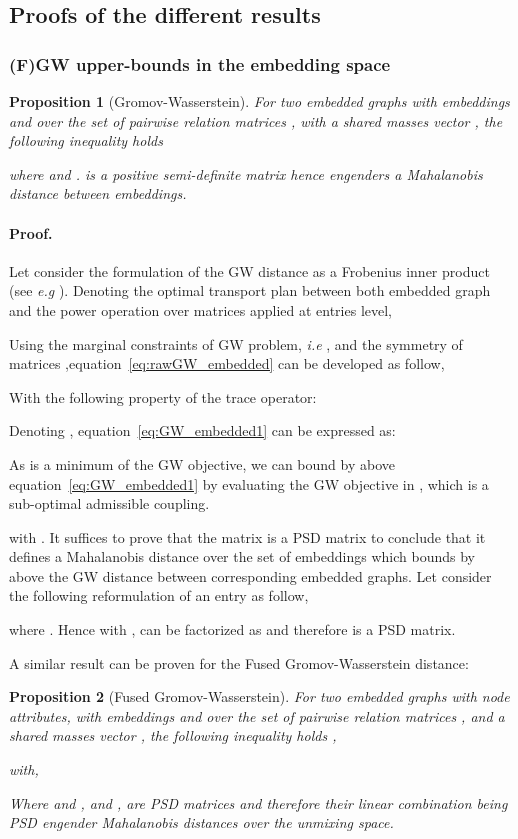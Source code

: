 \documentclass{article}
\def\eqref#1{equation~\ref{#1}}
\newtheorem{proposition}{Proposition}
\begin{document}
	\subsection{Proofs of the different results}
	\subsubsection{(F)GW upper-bounds in the embedding space}
	\begin{proposition}[Gromov-Wasserstein]
		\label{prop:embed_graph}
		For two embedded graphs with embeddings  and  over the set of pairwise relation matrices , with a shared masses vector , the following inequality holds
		
		where  and .  is a positive semi-definite matrix hence engenders a Mahalanobis distance between embeddings.
	\end{proposition}
	\paragraph{Proof.} Let consider the formulation of the GW distance as a Frobenius inner product (see \emph{e.g} \citep{peyre2016gromov}). Denoting  the optimal transport plan between both embedded graph and the power operation over matrices applied at entries level, 
	
	Using the marginal constraints of GW problem, \emph{i.e} , and the symmetry of matrices ,\eqref{eq:rawGW_embedded} can be developed as follow,
	
	
	With the following property of the trace operator:
	
	Denoting , \eqref{eq:GW_embedded1} can be expressed as:
	
	As  is a minimum of the GW objective, we can bound by above \eqref{eq:GW_embedded1} by evaluating the GW objective in , which is a sub-optimal admissible coupling.
	
	with . It suffices to prove that the matrix  is a PSD matrix to conclude that it defines a Mahalanobis distance over the set of embeddings  which bounds by above the GW distance between corresponding embedded graphs.
	Let consider the following reformulation of an entry  as follow,
	
	where . Hence with   ,  can be factorized as  and therefore is a PSD matrix.
	
	
	A similar result can be proven for the Fused Gromov-Wasserstein distance:
	\begin{proposition}[Fused Gromov-Wasserstein]
		For two embedded graphs with node attributes, with embeddings  and  over the set of pairwise relation matrices , and a shared masses vector , the following inequality holds ,
		
		with,
		
		Where  and , and , are PSD matrices and therefore their linear combination being PSD engender Mahalanobis distances over the unmixing space.
	\end{proposition} 
\end{document}
